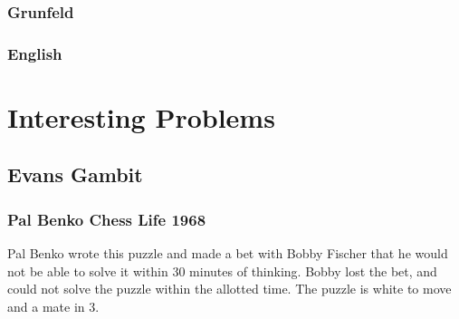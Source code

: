 \documentclass[]{book}
\begin{document}
\hypertarget{grunfeld}{%
\subsection{Grunfeld}\label{grunfeld}}

\hypertarget{english}{%
\subsection{English}\label{english}}

\hypertarget{interesting_problems}{%
\chapter{Interesting Problems}\label{interesting_problems}}

\hypertarget{evans-gambit-1}{%
\section{Evans Gambit}\label{evans-gambit-1}}

\hypertarget{pal-benko-chess-life-1968}{%
\subsection{Pal Benko Chess Life 1968}\label{pal-benko-chess-life-1968}}

Pal Benko wrote this puzzle and made a bet with Bobby Fischer that he would not be able to solve it within 30 minutes of thinking. Bobby lost the bet, and could not solve the puzzle within the allotted time. The puzzle is white to move and a mate in 3.


\end{document}
